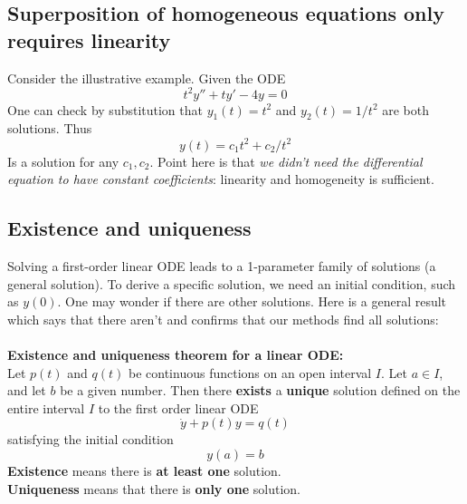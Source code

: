 \documentclass{report}
\begin{document}
\subsection{Superposition of homogeneous equations only requires linearity}
Consider the illustrative example. Given the ODE
\begin{equation*}
t^2y''+ty'-4y=0
\end{equation*}
One can check by substitution that $y_1(t)=t^2$ and $y_2(t)=1/t^2$ are both solutions. Thus
\begin{equation*}
y(t)=c_1t^2+c_2/t^2
\end{equation*}
Is a solution for any $c_1,c_2$.
Point here is that \textit{we didn't need the differential equation to have constant coefficients}: linearity and 
homogeneity is sufficient.

\subsection{Existence and uniqueness} %
Solving a first-order linear ODE leads to a 1-parameter family of solutions (a general solution).
To derive a specific solution, we need an initial condition, such as $y(0)$. One may wonder if
there are other solutions. Here is a general result which says that there aren't and confirms 
that our methods find all solutions:\\
\vspace{2mm}\\
\textbf{Existence and uniqueness theorem for a linear ODE:}\\
Let $p(t)$ and $q(t)$ be continuous functions on an open interval $I$. Let $a\in I$, and let $b$
be a given number. Then there \textbf{exists} a \textbf{unique} solution defined on the entire 
interval $I$ to the first order linear ODE
\begin{equation*}
\dot{y}+p(t)y=q(t)
\end{equation*}
satisfying the initial condition
\begin{equation*}
y(a)=b
\end{equation*}
\textbf{Existence} means there is \textbf{at least one} solution.\\
\textbf{Uniqueness} means that there is \textbf{only one} solution.
\newpage
\end{document}
